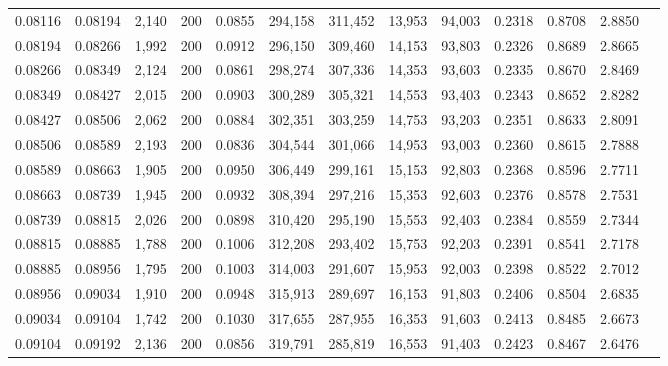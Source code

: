 \begin{tabular}{rrrrrrrrrrrrr}
0.08116 & 0.08194 &  2,140 & 200 &                                     0.0855 & 294,158 & 311,452 &  13,953 &  94,003 & 0.2318 & 0.8708 & 2.8850 \\
0.08194 & 0.08266 &  1,992 & 200 &                                     0.0912 & 296,150 & 309,460 &  14,153 &  93,803 & 0.2326 & 0.8689 & 2.8665 \\
0.08266 & 0.08349 &  2,124 & 200 &                                     0.0861 & 298,274 & 307,336 &  14,353 &  93,603 & 0.2335 & 0.8670 & 2.8469 \\
0.08349 & 0.08427 &  2,015 & 200 &                                     0.0903 & 300,289 & 305,321 &  14,553 &  93,403 & 0.2343 & 0.8652 & 2.8282 \\
0.08427 & 0.08506 &  2,062 & 200 &                                     0.0884 & 302,351 & 303,259 &  14,753 &  93,203 & 0.2351 & 0.8633 & 2.8091 \\
0.08506 & 0.08589 &  2,193 & 200 &                                     0.0836 & 304,544 & 301,066 &  14,953 &  93,003 & 0.2360 & 0.8615 & 2.7888 \\
0.08589 & 0.08663 &  1,905 & 200 &                                     0.0950 & 306,449 & 299,161 &  15,153 &  92,803 & 0.2368 & 0.8596 & 2.7711 \\
0.08663 & 0.08739 &  1,945 & 200 &                                     0.0932 & 308,394 & 297,216 &  15,353 &  92,603 & 0.2376 & 0.8578 & 2.7531 \\
0.08739 & 0.08815 &  2,026 & 200 &                                     0.0898 & 310,420 & 295,190 &  15,553 &  92,403 & 0.2384 & 0.8559 & 2.7344 \\
0.08815 & 0.08885 &  1,788 & 200 &                                     0.1006 & 312,208 & 293,402 &  15,753 &  92,203 & 0.2391 & 0.8541 & 2.7178 \\
0.08885 & 0.08956 &  1,795 & 200 &                                     0.1003 & 314,003 & 291,607 &  15,953 &  92,003 & 0.2398 & 0.8522 & 2.7012 \\
0.08956 & 0.09034 &  1,910 & 200 &                                     0.0948 & 315,913 & 289,697 &  16,153 &  91,803 & 0.2406 & 0.8504 & 2.6835 \\
0.09034 & 0.09104 &  1,742 & 200 &                                     0.1030 & 317,655 & 287,955 &  16,353 &  91,603 & 0.2413 & 0.8485 & 2.6673 \\
0.09104 & 0.09192 &  2,136 & 200 &                                     0.0856 & 319,791 & 285,819 &  16,553 &  91,403 & 0.2423 & 0.8467 & 2.6476 \\

\end{tabular}
